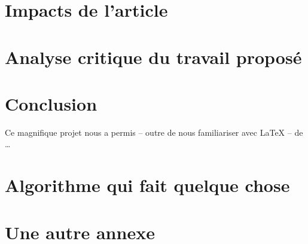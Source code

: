 \documentclass[a4paper, 12pt]{article}
\begin{document}
\clearpage 
\section{Impacts de l'article}

\clearpage 
\section{Analyse critique du travail proposé}

\clearpage 
\section*{Conclusion}

Ce magnifique projet nous a permis -- outre de nous familiariser avec \LaTeX{} -- de \ldots

\clearpage 




\clearpage 
\appendix
\bigskip{}
\section{Algorithme qui fait quelque chose}

\clearpage 
\section{Une autre annexe}
\end{document}
